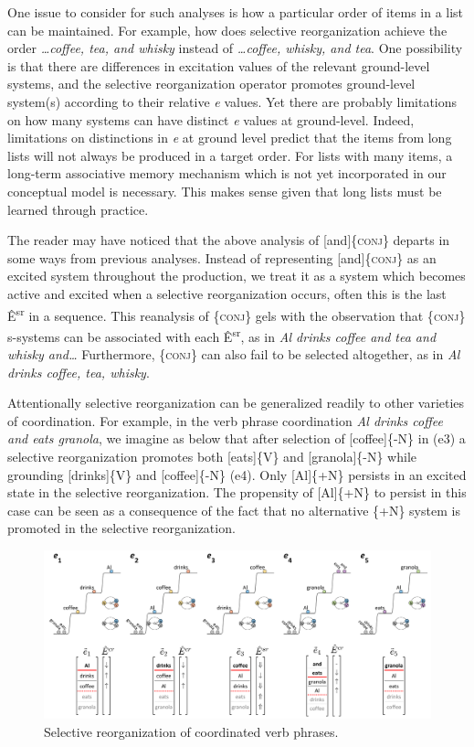   One issue to consider for such analyses is how a particular order of items in a list can be maintained. For example, how does selective reorganization achieve the order \textit{…coffee, tea, and whisky} instead of \textit{…coffee, whisky, and tea}. One possibility is that there are differences in excitation values of the relevant ground-level systems, and the selective reorganization operator promotes ground-level system(s) according to their relative \textit{e} values. Yet there are probably limitations on how many systems can have distinct \textit{e} values at ground-level. Indeed, limitations on distinctions in \textit{e} at ground level predict that the items from long lists will not always be produced in a target order. For lists with many items, a long-term associative memory mechanism which is not yet incorporated in our conceptual model is necessary. This makes sense given that long lists must be learned through practice.

  The reader may have noticed that the above analysis of [and]\{\textsc{conj}\} departs in some ways from previous analyses. Instead of representing [and]\{\textsc{conj}\} as an excited system throughout the production, we treat it as a system which becomes active and excited when a selective reorganization occurs, often this is the last Ê\textsuperscript{sr} in a sequence. This reanalysis of \{\textsc{conj}\} gels with the observation that \{\textsc{conj}\} s-systems can be associated with each Ê\textsuperscript{sr}, as in \textit{Al drinks coffee and tea and whisky and…} Furthermore, \{\textsc{conj}\} can also fail to be selected altogether, as in \textit{Al drinks coffee, tea, whisky}.

  Attentionally selective reorganization can be generalized readily to other varieties of coordination. For example, in the verb phrase coordination \textit{Al drinks coffee and eats granola}, we imagine as below that after selection of [coffee]\{-N\} in (e3) a selective reorganization promotes both [eats]\{V\} and [granola]\{-N\} while grounding [drinks]\{V\} and [coffee]\{-N\} (e4). Only [Al]\{+N\} persists in an excited state in the selective reorganization. The propensity of [Al]\{+N\} to persist in this case can be seen as a consequence of the fact that no alternative \{+N\} system is promoted in the selective reorganization.

  
\begin{figure}
\includegraphics[width=\textwidth]{figures/Tilsen-img100.png}
\caption{Selective reorganization of coordinated verb phrases.}
\label{fig:4:50}
\end{figure}
 

